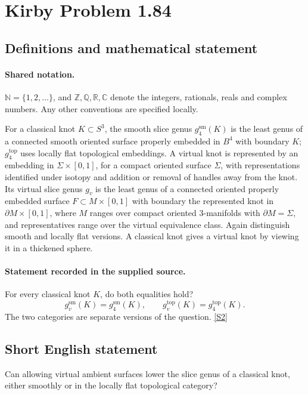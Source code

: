 \documentclass[11pt]{article}
\newcommand{\sref}[2]{\hyperlink{source:#1:#2}{[S#2]}}
\begin{document}
\section{Kirby Problem 1.84}\label{statement}

\subsection{Definitions and mathematical statement}

\paragraph{Shared notation.}$\mathbb N=\{1,2,\ldots\}$, and $\mathbb Z,\mathbb Q,\mathbb R,\mathbb C$ denote the integers, rationals, reals and complex numbers. Any other conventions are specified locally.


For a classical knot $K\subset S^3$, the smooth slice genus $g_4^{\mathrm{sm}}(K)$ is the least genus of a connected smooth oriented surface properly embedded in $B^4$ with boundary $K$; $g_4^{\mathrm{top}}$ uses locally flat topological embeddings. A virtual knot is represented by an embedding in $\Sigma\times[0,1]$, for a compact oriented surface $\Sigma$, with representations identified under isotopy and addition or removal of handles away from the knot. Its virtual slice genus $g_v$ is the least genus of a connected oriented properly embedded surface $F\subset M\times[0,1]$ with boundary the represented knot in $\partial M\times[0,1]$, where $M$ ranges over compact oriented 3-manifolds with $\partial M=\Sigma$, and representatives range over the virtual equivalence class. Again distinguish smooth and locally flat versions. A classical knot gives a virtual knot by viewing it in a thickened sphere.
\paragraph{Statement recorded in the supplied source.}
For every classical knot $K$, do both equalities hold?
\[g_v^{\mathrm{sm}}(K)=g_4^{\mathrm{sm}}(K),\qquad g_v^{\mathrm{top}}(K)=g_4^{\mathrm{top}}(K).\]
The two categories are separate versions of the question. \sref{statement}{2}

\subsection{Short English statement}
Can allowing virtual ambient surfaces lower the slice genus of a classical knot, either smoothly or in the locally flat topological category?
\end{document}
